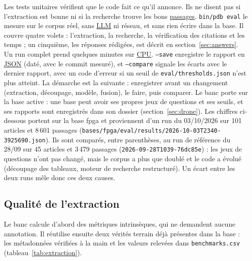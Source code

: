 \documentclass[11pt,a4paper]{article}
\newcommand{\cmd}[1]{\texttt{#1}}
\newcommand{\gl}[2]{\hyperlink{gl:#1}{\textcolor{glcolor}{#2}}}
\begin{document}
Les tests unitaires vérifient que le code fait ce qu'il annonce. Ils ne disent pas si
l'extraction est bonne ni si la recherche trouve les bons \gl{passage}{passages}. \cmd{bin/pdb eval} le
mesure sur le corpus réel, sans \gl{LLM}{LLM} ni réseau, et sans rien écrire dans la base. Il couvre
quatre volets : l'extraction, la recherche, la vérification des citations et les temps ; un
cinquième, les réponses rédigées, est décrit en section~\ref{sec:answers}.
Un run complet prend quelques minutes sur \gl{CPU}{CPU}. \cmd{--save} enregistre le rapport en \gl{JSON}{JSON}
(daté, avec le commit mesuré), et \cmd{--compare} signale les écarts avec le dernier rapport,
avec un code d'erreur si un seuil de \cmd{eval/thresholds.json} n'est plus atteint. La
démarche est la suivante : enregistrer avant un changement (extraction, découpage, modèle,
fusion), le faire, puis comparer. Le banc porte sur la base active : une base peut avoir ses
propres jeux de questions et ses seuils, et ses rapports sont enregistrés dans son dossier
(section~\ref{sec:drone}). Les chiffres ci-dessous portent sur la base fpga et proviennent
d'un run du 03/10/2026 sur 101 articles et 8\,601 passages
(\cmd{bases/fpga/eval/results/2026-10-03T2340-3925690.json}). Ils sont comparés, entre
parenthèses, au run de référence du 28/09 sur 45 articles et 3\,479 passages
(\cmd{2026-09-28T1039-76dc85e}) : les jeux de questions n'ont pas changé, mais le corpus a
plus que doublé et le code a évolué (découpage des tableaux, moteur de recherche
restructuré). Un écart entre les deux runs mêle donc ces deux causes.

\subsection{Qualité de l'extraction}

Le banc calcule d'abord des métriques intrinsèques, qui ne demandent aucune annotation. Il
réutilise ensuite deux vérités terrain déjà présentes dans la base : les métadonnées
vérifiées à la main et les valeurs relevées dans \cmd{benchmarks.csv}
(tableau~\ref{tab:extraction}).
\end{document}
